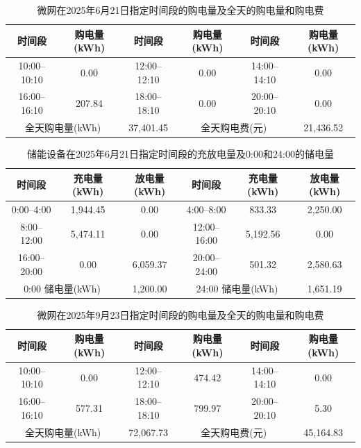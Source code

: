 \begin{table}[H]
  \centering
  \caption{微网在2025年6月21日指定时间段的购电量及全天的购电量和购电费}
  \label{tab:q2-purchase-0621}
  \small
  \renewcommand{\arraystretch}{1.3}
  \begin{tabular}{|c|c|c|c|c|c|}
    \hline
    时间段 & 购电量(kWh) & 时间段 & 购电量(kWh) & 时间段 & 购电量(kWh) \\
    \hline
    10:00--10:10 & 0.00 & 12:00--12:10 & 0.00 & 14:00--14:10 & 0.00 \\
    \hline
    16:00--16:10 & 207.84 & 18:00--18:10 & 0.00 & 20:00--20:10 & 0.00 \\
    \hline
    \multicolumn{2}{|c|}{全天购电量(kWh)}
    & \multicolumn{1}{c|}{37{,}401.45}
    & \multicolumn{2}{c|}{全天购电费(元)}
    & \multicolumn{1}{c|}{21{,}436.52} \\
    \hline
  \end{tabular}
\end{table}

\begin{table}[H]
  \centering
  \caption{储能设备在2025年6月21日指定时间段的充放电量及0:00和24:00的储电量}
  \label{tab:q2-storage-0621}
  \small
  \renewcommand{\arraystretch}{1.3}
  \begin{tabular}{|c|c|c|c|c|c|}
    \hline
    时间段 & 充电量(kWh) & 放电量(kWh)
    & 时间段 & 充电量(kWh) & 放电量(kWh) \\
    \hline
    0:00--4:00 & 1{,}944.45 & 0.00
    & 4:00--8:00 & 833.33 & 2{,}250.00 \\
    \hline
    8:00--12:00 & 5{,}474.11 & 0.00
    & 12:00--16:00 & 5{,}192.56 & 0.00 \\
    \hline
    16:00--20:00 & 0.00 & 6{,}059.37
    & 20:00--24:00 & 501.32 & 2{,}580.63 \\
    \hline
    \multicolumn{2}{|c|}{0:00 储电量(kWh)}
    & \multicolumn{1}{c|}{1{,}200.00}
    & \multicolumn{2}{c|}{24:00 储电量(kWh)}
    & \multicolumn{1}{c|}{1{,}651.19} \\
    \hline
  \end{tabular}
\end{table}

\begin{table}[H]
  \centering
  \caption{微网在2025年9月23日指定时间段的购电量及全天的购电量和购电费}
  \label{tab:q2-purchase-0923}
  \small
  \renewcommand{\arraystretch}{1.3}
  \begin{tabular}{|c|c|c|c|c|c|}
    \hline
    时间段 & 购电量(kWh) & 时间段 & 购电量(kWh) & 时间段 & 购电量(kWh) \\
    \hline
    10:00--10:10 & 0.00 & 12:00--12:10 & 474.42 & 14:00--14:10 & 0.00 \\
    \hline
    16:00--16:10 & 577.31 & 18:00--18:10 & 799.97 & 20:00--20:10 & 5.30 \\
    \hline
    \multicolumn{2}{|c|}{全天购电量(kWh)}
    & \multicolumn{1}{c|}{72{,}067.73}
    & \multicolumn{2}{c|}{全天购电费(元)}
    & \multicolumn{1}{c|}{45{,}164.83} \\
    \hline
  \end{tabular}
\end{table}

